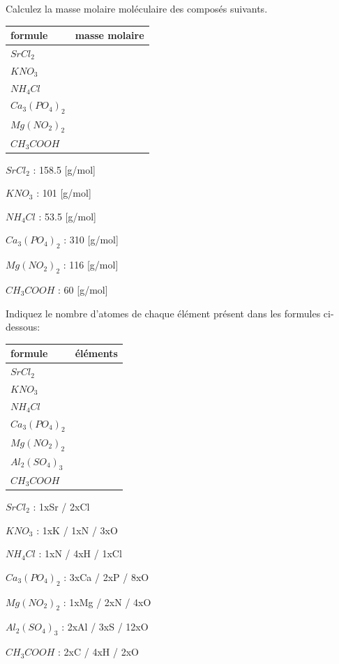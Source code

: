 \documentclass[
  11pt,
  french,
  a4paper,
  openany]{book}
\begin{document}
\begin{Exercise}
Calculez la masse molaire moléculaire des composés suivants.

\end{Exercise}

\begin{longtable}[]{@{}lc@{}}
\toprule
formule & masse molaire\tabularnewline
\midrule
\endhead
\(SrCl_2\) &\tabularnewline
\(KNO_3\) &\tabularnewline
\(NH_4Cl\) &\tabularnewline
\(Ca_3(PO_4)_2\) &\tabularnewline
\(Mg(NO_2)_2\) &\tabularnewline
\(CH_3COOH\) &\tabularnewline
\bottomrule
\end{longtable}

\begin{Answer}

\begin{multicols}{2}
\(SrCl_2\) : 158.5 {[}g/mol{]}

\(KNO_3\) : 101 {[}g/mol{]}

\(NH_4Cl\) : 53.5 {[}g/mol{]}

\(Ca_3(PO_4)_2\) : 310 {[}g/mol{]}

\(Mg(NO_2)_2\) : 116 {[}g/mol{]}

\(CH_3COOH\) : 60 {[}g/mol{]}

\end{multicols}


\end{Answer}

\begin{Exercise}
Indiquez le nombre d'atomes de chaque élément présent dans les formules ci-dessous:

\end{Exercise}

\begin{longtable}[]{@{}lc@{}}
\toprule
formule & éléments\tabularnewline
\midrule
\endhead
\(SrCl_2\) & \includegraphics{images/1px.png}\tabularnewline
\(KNO_3\) &\tabularnewline
\(NH_4Cl\) &\tabularnewline
\(Ca_3(PO_4)_2\) &\tabularnewline
\(Mg(NO_2)_2\) &\tabularnewline
\(Al_2(SO_4)_3\) &\tabularnewline
\(CH_3COOH\) &\tabularnewline
\bottomrule
\end{longtable}

\begin{Answer}

\begin{multicols}{2}
\(SrCl_2\) : 1xSr / 2xCl

\(KNO_3\) : 1xK / 1xN / 3xO

\(NH_4Cl\) : 1xN / 4xH / 1xCl

\(Ca_3(PO_4)_2\) : 3xCa / 2xP / 8xO

\(Mg(NO_2)_2\) : 1xMg / 2xN / 4xO

\(Al_2(SO_4)_3\) : 2xAl / 3xS / 12xO

\(CH_3COOH\) : 2xC / 4xH / 2xO

\end{multicols}


\end{Answer}
\end{document}

